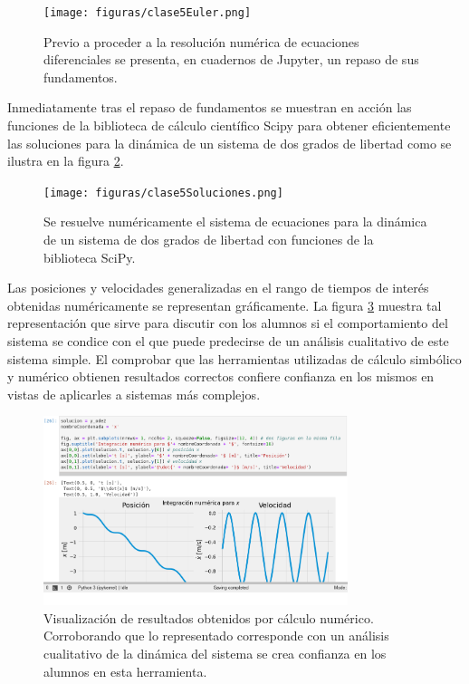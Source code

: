\begin{figure}[!ht]
\centering
\texttt{[image: figuras/clase5Euler.png]}
\caption{Previo a proceder a la resolución numérica de ecuaciones diferenciales se presenta, en cuadernos de Jupyter, un repaso de sus fundamentos.}
\label{fig:clase5res}
\end{figure}

Inmediatamente tras el repaso de fundamentos se muestran en acción las funciones de la biblioteca de cálculo científico Scipy para obtener eficientemente las soluciones para la dinámica de un sistema de dos grados de libertad como se ilustra en la figura \ref{fig:clase5sol}.

\begin{figure}[!ht]
\centering
\texttt{[image: figuras/clase5Soluciones.png]}
\caption{Se resuelve numéricamente el sistema de ecuaciones para la dinámica de un sistema de dos grados de libertad con funciones de la biblioteca SciPy.}
\label{fig:clase5sol}
\end{figure}

Las posiciones y velocidades generalizadas en el rango de tiempos de interés obtenidas numéricamente se representan gráficamente. La figura \ref{fig:clase5rep} muestra tal representación que sirve para discutir con los alumnos si el comportamiento del sistema se condice con el que puede predecirse de un análisis cualitativo de este sistema simple. El comprobar que las herramientas utilizadas de cálculo simbólico y numérico obtienen resultados correctos confiere confianza en los mismos en vistas de aplicarles a sistemas más complejos.

\begin{figure}[!ht]
\centering
\includegraphics[width=3.5in]{figuras/clase5Representación.png}
\caption{Visualización de resultados obtenidos por cálculo numérico. Corroborando que lo representado corresponde con un análisis cualitativo de la dinámica del sistema se crea confianza en los alumnos en esta herramienta.}
\label{fig:clase5rep}
\end{figure}

